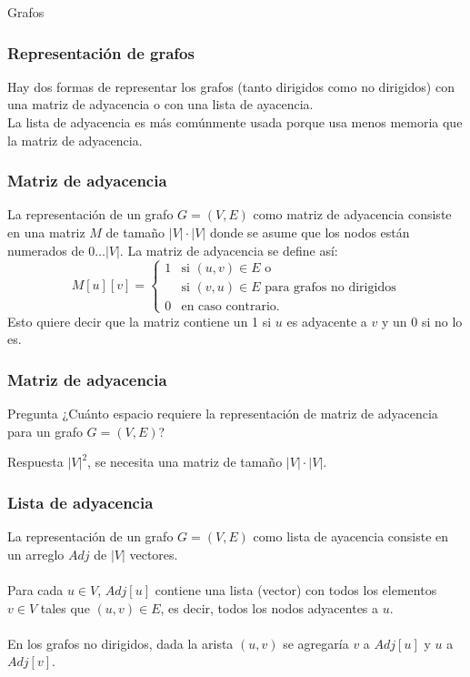 \documentclass{beamer}
\begin{document}
\begin{section}{Grafos}
	\begin{frame}
		\frametitle{Representación de grafos}
		Hay dos formas de representar los grafos (tanto dirigidos como no dirigidos) con una matriz de adyacencia o con una lista de ayacencia.\\
		La lista de adyacencia es más comúnmente usada porque usa menos memoria que la matriz de adyacencia.
	\end{frame}
	
	\begin{frame}[fragile]
		\frametitle{Matriz de adyacencia}
		La representación de un grafo $G = (V, E)$ como matriz de adyacencia consiste en una matriz $M$ de tamaño $|V| \cdot |V|$ donde se asume que los nodos están numerados de $0 \ldots |V|$. La matriz de adyacencia se define así:
		\begin{equation}
			M[u][v] =
			\left\{
				\begin{array}{ll}
					1 & \mbox{si } (u, v) \in E \mbox{ o} \\
					  & \mbox{si } (v, u) \in E \mbox{ para grafos no dirigidos}\\
					0 & \mbox{en caso contrario.} 
				\end{array}
			\right.
		\end{equation}
		Esto quiere decir que la matriz contiene un 1 si $u$ es adyacente a $v$ y un 0 si no lo es.
	\end{frame}
	
	\begin{frame}
		\frametitle{Matriz de adyacencia}
		\begin{alertblock}{Pregunta}
			¿Cuánto espacio requiere la representación de matriz de adyacencia para un grafo $G = (V, E)$?
		\end{alertblock}\pause
		\begin{exampleblock}{Respuesta}
			$|V|^2$, se necesita una matriz de tamaño $|V| \cdot |V|$.
		\end{exampleblock}
	\end{frame}
	
	\begin{frame}[fragile]
		\frametitle{Lista de adyacencia}
		La representación de un grafo $G = (V, E)$ como lista de ayacencia consiste en un arreglo $Adj$ de $|V|$ vectores.\\ \quad \\
		Para cada $u \in V$, $Adj[u]$ contiene una lista (vector) con todos los elementos $v \in V$ tales que $(u, v) \in E$, es decir, todos los nodos adyacentes a $u$. \\ \quad \\
		En los grafos no dirigidos, dada la arista $(u, v)$ se agregaría $v$ a $Adj[u]$ y $u$ a $Adj[v]$.
	\end{frame}
	

\end{section}
\end{document}
